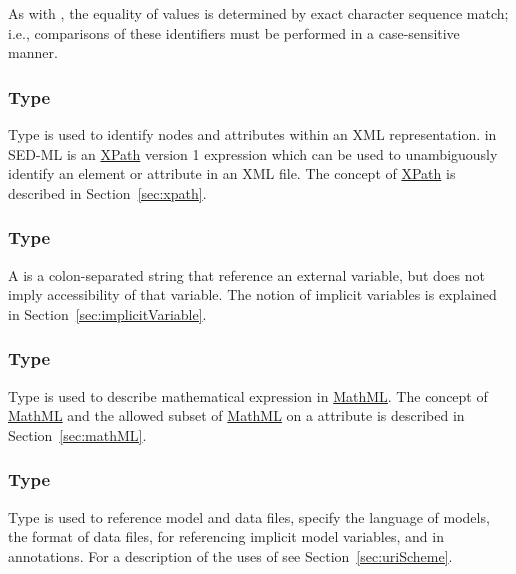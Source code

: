 As with \hyperref[type:sid]{}, the equality of  values is determined by exact character sequence match; i.e., comparisons of these identifiers must be performed in a case-sensitive manner.

\subsubsection[\element{XPath}]{Type }
\label{type:xpath}
Type  is used to identify nodes and attributes within an XML representation.  in SED-ML is an \hyperref[sec:xpath]{XPath} version 1 expression which can be used to unambiguously identify an element or attribute in an XML file. The concept of \hyperref[sec:xpath]{XPath} is described in Section~\ref{sec:xpath}.

\begin{blockChanged}
\subsubsection[\element{URN}]{Type }
\label{type:urn}
A  is a colon-separated string that reference an external variable, but does not imply accessibility of that variable.  The notion of implicit variables is explained in Section~\ref{sec:implicitVariable}.
\end{blockChanged}

\subsubsection[\element{MathML}]{Type }
\label{type:mathml}
Type  is used to describe mathematical expression in \hyperref[sec:mathML]{MathML}. The concept of \hyperref[sec:mathML]{MathML} and the allowed subset of \hyperref[sec:mathML]{MathML} on a  attribute is described in Section~\ref{sec:mathML}.

\subsubsection[\element{anyURI}]{Type }
\label{type:anyURI}
Type  is used to reference model and data files, specify the language of models, the format of data files, for referencing implicit model variables, and in annotations. For a description of the uses of  see Section~\ref{sec:uriScheme}.

